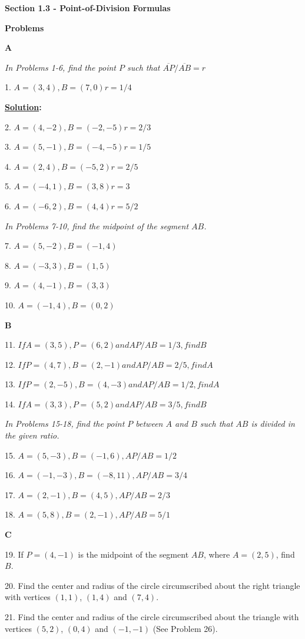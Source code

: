 \documentclass[10pt,letterpaper]{article}
\begin{document}
\textbf{Section 1.3 - Point-of-Division Formulas}
\medskip

\textbf{Problems}

\medskip
\textbf{A}
\medskip

\textit{In Problems 1-6, find the point $P$ such that $\overline{AP}/\overline{AB} = r$}

1. $A=(3,4), B=(7,0) r=1/4$

\medskip
\textbf{\underline {Solution}:}

2. $A=(4,-2), B=(-2,-5) r=2/3$

3. $A=(5, -1), B=(-4,-5) r=1/5$

4. $A=(2,4), B=(-5,2) r=2/5$

5. $A=(-4,1), B=(3,8) r=3$

6. $A=(-6,2), B=(4,4) r=5/2$

\medskip
\textit{In Problems 7-10, find the midpoint of the segment $AB$.}
\medskip

7. $A=(5,-2), B=(-1,4)$

8. $A=(-3,3), B=(1,5)$

9. $A=(4,-1), B=(3,3)$

10. $A=(-1,4), B=(0,2)$

\medskip
\textbf{B}
\medskip

11. $If A=(3,5), P=(6,2) and AP/AB=1/3, find B$

12. $If P=(4,7), B=(2,-1) and AP/AB=2/5, find A$

13. $If P=(2,-5), B=(4,-3) and AP/AB=1/2, find A$

14. $If A=(3,3), P=(5,2) and AP/AB=3/5, find B$

\medskip
\textit{In Problems 15-18, find the point $P$ between $A$ and $B$ such that $AB$ is divided in the given ratio.}
\medskip

15. $A=(5,-3), B=(-1,6), AP/AB=1/2$

16. $A=(-1,-3), B=(-8,11), AP/AB=3/4$

17. $A=(2,-1), B=(4,5), AP/AB=2/3$

18. $A=(5,8), B=(2,-1), AP/AB=5/1$

\medskip
\textbf{C}
\medskip

19. If $P=(4,-1)$ is the midpoint of the segment $AB$, where $A=(2,5)$, find $B$.

20. Find the center and radius of the circle circumscribed about the right triangle with vertices $(1,1)$, $(1,4)$ and $(7,4)$.

21. Find the center and radius of the circle circumscribed about the triangle with vertices $(5,2)$, $(0,4)$ and $(-1, -1)$ (See Problem 26).
\end{document}
